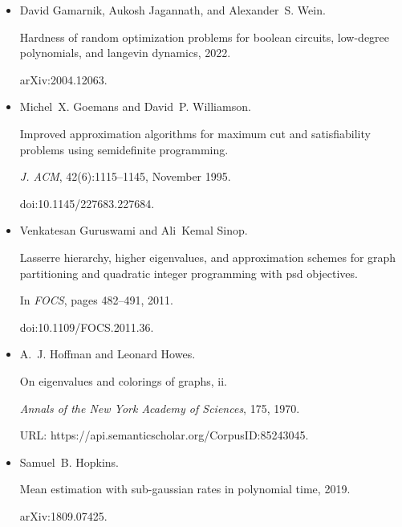\documentclass[10pt,a4paper]{article}
\begin{document}
\begin{itemize}
\item[] 
[15]

David Gamarnik, Aukosh Jagannath, and Alexander S. Wein.


Hardness of random optimization problems for boolean circuits,
low-degree polynomials, and langevin dynamics, 2022.


arXiv:2004.12063.





\item[] 
[16]

Michel X. Goemans and David P. Williamson.


Improved approximation algorithms for maximum cut and satisfiability
problems using semidefinite programming.


\emph{J. ACM}, 42(6):1115–1145, November 1995.


doi:10.1145/227683.227684.





\item[] 
[17]

Venkatesan Guruswami and Ali Kemal Sinop.


Lasserre hierarchy, higher eigenvalues, and approximation schemes for
graph partitioning and quadratic integer programming with psd objectives.


In \emph{FOCS}, pages 482–491, 2011.


doi:10.1109/FOCS.2011.36.





\item[] 
[18]

A. J. Hoffman and Leonard Howes.


On eigenvalues and colorings of graphs, ii.


\emph{Annals of the New York Academy of Sciences}, 175, 1970.


URL: https://api.semanticscholar.org/CorpusID:85243045.





\item[] 
[19]

Samuel B. Hopkins.


Mean estimation with sub-gaussian rates in polynomial time, 2019.


arXiv:1809.07425.






\end{itemize}
\end{document}
